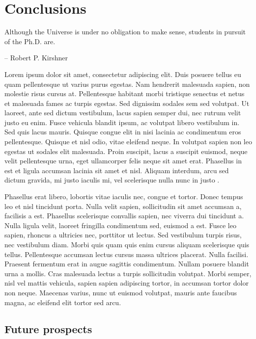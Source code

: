 \chapter{Conclusions}\label{conclusions}

\epigraph{Although the Universe is under no obligation to make sense, students in pursuit of the Ph.D. are.}{-- Robert P. Kirshner\footnotemark}

 Lorem ipsum dolor sit amet, consectetur adipiscing elit. Duis posuere tellus eu quam pellentesque ut varius purus egestas. Nam hendrerit malesuada sapien, non molestie risus cursus at. Pellentesque habitant morbi tristique senectus et netus et malesuada fames ac turpis egestas. Sed dignissim sodales sem sed volutpat. Ut laoreet, ante sed dictum vestibulum, lacus sapien semper dui, nec rutrum velit justo eu enim. Fusce vehicula blandit ipsum, ac volutpat libero vestibulum in. Sed quis lacus mauris. Quisque congue elit in nisi lacinia ac condimentum eros pellentesque. Quisque et nisl odio, vitae eleifend neque. In volutpat sapien non leo egestas ut sodales elit malesuada. Proin suscipit, lacus a suscipit euismod, neque velit pellentesque urna, eget ullamcorper felis neque sit amet erat. Phasellus in est et ligula accumsan lacinia sit amet et nisl. Aliquam interdum, arcu sed dictum gravida, mi justo iaculis mi, vel scelerisque nulla nunc in justo \citep{Murphy12}.

Phasellus erat libero, lobortis vitae iaculis nec, congue et tortor. Donec tempus leo et nisl tincidunt porta. Nulla velit sapien, sollicitudin sit amet accumsan a, facilisis a est. Phasellus scelerisque convallis sapien, nec viverra dui tincidunt a. Nulla ligula velit, laoreet fringilla condimentum sed, euismod a est. Fusce leo sapien, rhoncus a ultricies nec, porttitor ut lectus. Sed vestibulum turpis risus, nec vestibulum diam. Morbi quis quam quis enim cursus aliquam scelerisque quis tellus. Pellentesque accumsan lectus cursus massa ultrices placerat. Nulla facilisi. Praesent fermentum erat in augue sagittis condimentum. Nullam posuere blandit urna a mollis. Cras malesuada lectus a turpis sollicitudin volutpat. Morbi semper, nisl vel mattis vehicula, sapien sapien adipiscing tortor, in accumsan tortor dolor non neque. Maecenas varius, nunc ut euismod volutpat, mauris ante faucibus magna, ac eleifend elit tortor sed arcu.

\section{Future prospects} 


